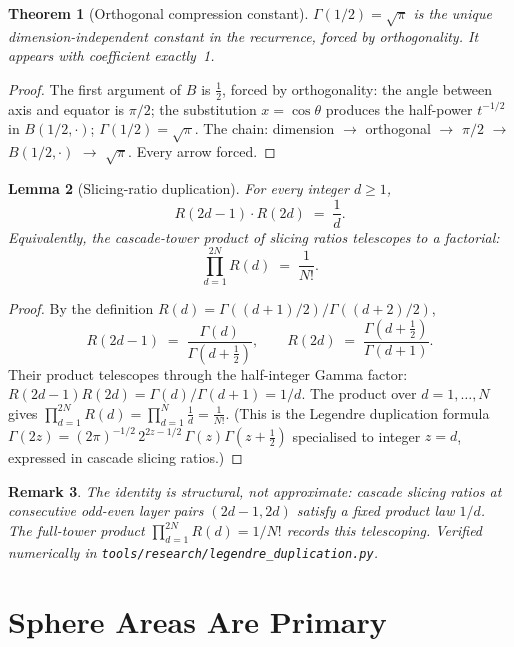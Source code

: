 \documentclass[11pt,a4paper]{article}
\newtheorem{theorem}{Theorem}[section]
\newtheorem{lemma}[theorem]{Lemma}
\newtheorem{remark}[theorem]{Remark}
\begin{document}
\begin{theorem}[Orthogonal compression constant]\label{thm:sqrtpi}
$\Gamma(1/2) = \sqrt{\pi}$ is the unique dimension-independent constant in
the recurrence, forced by orthogonality. It appears with coefficient
exactly~1.
\end{theorem}

\begin{proof}
The first argument of $B$ is $\frac{1}{2}$, forced by orthogonality: the
angle between axis and equator is $\pi/2$; the substitution
$x = \cos\theta$ produces the half-power $t^{-1/2}$ in $B(1/2,\cdot)$;
$\Gamma(1/2) = \sqrt{\pi}$. The chain: dimension $\to$ orthogonal $\to$
$\pi/2$ $\to$ $B(1/2,\cdot)$ $\to$ $\sqrt{\pi}$. Every arrow forced.
\end{proof}

\begin{lemma}[Slicing-ratio duplication]\label{lem:R-duplication}
For every integer $d \geq 1$,
\[
R(2d-1)\cdot R(2d) \;=\; \frac{1}{d}.
\]
Equivalently, the cascade-tower product of slicing ratios telescopes to a factorial:
\[
\prod_{d=1}^{2N} R(d) \;=\; \frac{1}{N!}.
\]
\end{lemma}

\begin{proof}
By the definition $R(d) = \Gamma((d+1)/2)/\Gamma((d+2)/2)$,
\[
R(2d-1)\;=\;\frac{\Gamma(d)}{\Gamma(d+\tfrac{1}{2})},\qquad
R(2d)\;=\;\frac{\Gamma(d+\tfrac{1}{2})}{\Gamma(d+1)}.
\]
Their product telescopes through the half-integer Gamma factor: $R(2d-1)R(2d) = \Gamma(d)/\Gamma(d+1) = 1/d$. The product over $d = 1, \ldots, N$ gives $\prod_{d=1}^{2N} R(d) = \prod_{d=1}^{N} \frac{1}{d} = \frac{1}{N!}$. (This is the Legendre duplication formula $\Gamma(2z) = (2\pi)^{-1/2}\,2^{2z-1/2}\,\Gamma(z)\Gamma(z+\tfrac{1}{2})$ specialised to integer $z = d$, expressed in cascade slicing ratios.)
\end{proof}

\begin{remark}
The identity is structural, not approximate: cascade slicing ratios at consecutive odd-even layer pairs $(2d{-}1, 2d)$ satisfy a fixed product law $1/d$. The full-tower product $\prod_{d=1}^{2N} R(d) = 1/N!$ records this telescoping. Verified numerically in \texttt{tools/research/legendre\_duplication.py}.
\end{remark}

\section{Sphere Areas Are Primary}\label{sec:sphere-areas-are-primary}
\end{document}
